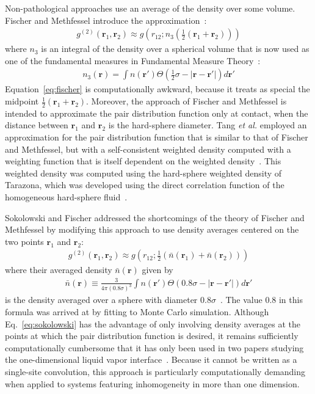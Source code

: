 \documentclass[letterpaper,twocolumn,amsmath,amssymb,pre,aps,10pt]{revtex4-1}
\newcommand{\rr}{\textbf{r}}
\begin{document}
Non-pathological approaches use an average of the density over some
volume. Fischer and Methfessel introduce the
approximation~\cite{fischer1980born,harris1987comment}:
\begin{align}
  g^{(2)}(\rr_1,\rr_2) \approx g\left(r_{12}; n_3\left(\tfrac12
  (\rr_1+\rr_2)\right)\right)
  \label{eq:fischer}
\end{align}
where $n_3$ is an integral of the density over a spherical volume that
is now used as one of the fundamental measures in Fundamental
Measure Theory~\cite{rosenfeld1989free}:
\begin{align}
  n_3(\rr) = \int n(\rr')\Theta(\tfrac12 \sigma - |\rr-\rr'|) d\rr'
\end{align}
Equation~\ref{eq:fischer} is computationally awkward, because it
treats as special the midpoint $\tfrac12(\rr_1+\rr_2)$.  Moreover, the
approach of Fischer and Methfessel is intended to approximate the pair
distribution function only at contact, when the distance between
$\rr_1$ and $\rr_2$ is the hard-sphere diameter.
%
Tang \emph{et al.} employed an approximation for the pair distribution
function that is similar to that of Fischer and Methfessel, but with a
self-consistent weighted density computed with a weighting function that
is itself dependent on the weighted density~\cite{tang1991density}.
This weighted density was computed using the hard-sphere weighted
density of Tarazona, which was developed using the direct correlation
function of the homogeneous hard-sphere fluid~\cite{tarazona1985free}.

Sokolowski and Fischer addressed the shortcomings of the theory of
Fischer and Methfessel by modifying this approach to use density
averages centered on the two points $\rr_1$ and $\rr_2$:
\begin{align}
  g^{(2)}(\rr_1,\rr_2) \approx g\left(r_{12};
  \tfrac12(\bar{n}(\rr_1)+\bar{n}(\rr_2))\right)
  \label{eq:sokolowski}
\end{align}
where their averaged density $\bar{n}(\rr)$ given by
\begin{align}
  \bar{n}(\rr) \equiv \frac{3}{4\pi (0.8\sigma)^3}\int n(\rr')\Theta(0.8\sigma - |\rr-\rr'|) d\rr'
\end{align}
is the density averaged over a sphere with diameter
$0.8\sigma$~\cite{sokolowski1992role}.  The value 0.8 in this formula
was arrived at by fitting to Monte Carlo simulation.  Although
Eq.~\ref{eq:sokolowski} has the advantage of only involving
density averages at the points at which the pair distribution function
is desired, it remains sufficiently computationally cumbersome that it
has only been used in two papers studying the one-dimensional liquid vapor
interface~\cite{wadewitz2000application, winkelmann2001liquid}.
Because it cannot be written as a single-site convolution, this
approach is particularly computationally demanding when applied to
systems featuring inhomogeneity in more than one dimension.
\end{document}
